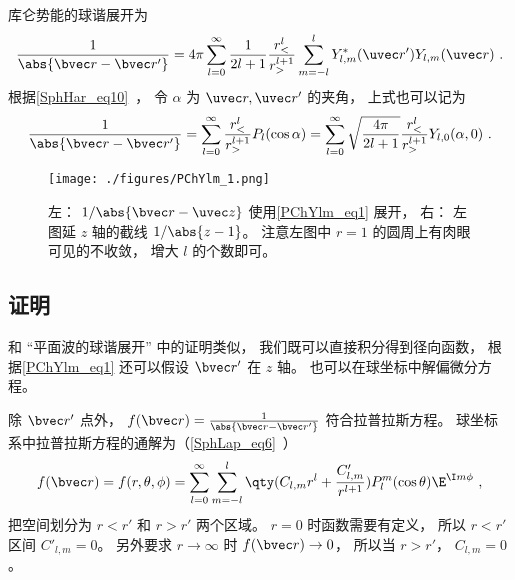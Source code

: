 
\begin{issues}
\issueDraft
\end{issues}


库仑势能的球谐展开为
\begin{equation}
\frac{1}{\abs{\bvec r - \bvec r'}} = 4\pi \sum_{l=0}^{\infty} \frac{1}{2l+1} \frac{r_<^l}{r_>^{l+1}} \sum_{m = -l}^l Y_{l,m}^*(\uvec r') Y_{l,m}(\uvec r)~.
\end{equation}
根据\autoref{SphHar_eq10}~， 令 $\alpha$ 为 $\uvec r, \uvec r'$ 的夹角， 上式也可以记为
\begin{equation}\label{PChYlm_eq1}
\frac{1}{\abs{\bvec r - \bvec r'}} = \sum_{l=0}^{\infty} \frac{r_<^l}{r_>^{l+1}} P_l(\cos\alpha) = \sum_{l=0}^{\infty} \sqrt{\frac{4\pi}{2l+1}} \frac{r_<^l}{r_>^{l+1}} Y_{l,0}(\alpha, 0)~.
\end{equation}

\begin{figure}[ht]
\centering
\texttt{[image: ./figures/PChYlm\_1.png]}
\caption{左： $1/\abs{\bvec r - \uvec z}$ 使用\autoref{PChYlm_eq1} 展开， 右： 左图延 $z$ 轴的截线 $1/\abs{z - 1}$。 注意左图中 $r = 1$ 的圆周上有肉眼可见的不收敛， 增大 $l$ 的个数即可。} \label{PChYlm_fig1}
\end{figure}

\subsection{证明}
和 “平面波的球谐展开” 中的证明类似， 我们既可以直接积分得到径向函数， 根据\autoref{PChYlm_eq1} 还可以假设 $\bvec r'$ 在 $z$ 轴。 也可以在球坐标中解偏微分方程。

除 $\bvec r'$ 点外， $f(\bvec r) = \frac{1}{\abs{\bvec r - \bvec r'}}$ 符合拉普拉斯方程。 球坐标系中拉普拉斯方程的通解为（\autoref{SphLap_eq6}~）
\begin{equation}
f(\bvec r) = f(r, \theta, \phi) = \sum_{l = 0}^\infty \sum_{m = -l}^l \qty(C_{l,m} r^l + \frac{C'_{l,m}}{r^{l+1}})P_l^m(\cos\theta)\E^{\I m\phi}~,
\end{equation}
把空间划分为 $r < r'$ 和 $r > r'$ 两个区域。 $r = 0$ 时函数需要有定义， 所以 $r < r'$ 区间 $C'_{l,m} = 0$。 另外要求 $r \to \infty$ 时 $f(\bvec r) \to 0$， 所以当 $r > r'$， $C_{l,m} = 0$。


